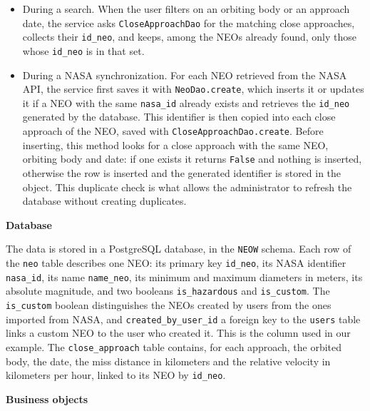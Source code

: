\documentclass[
  french,
  11pt,
  a4paper,
]{report}
\begin{document}
\begin{itemize}
\item
  During a search. When the user filters on an orbiting body or an
  approach date, the service asks \texttt{CloseApproachDao} for the
  matching close approaches, collects their \texttt{id\_neo}, and keeps,
  among the NEOs already found, only those whose \texttt{id\_neo} is in
  that set.
\item
  During a NASA synchronization. For each NEO retrieved from the NASA
  API, the service first saves it with \texttt{NeoDao.create}, which
  inserts it or updates it if a NEO with the same \texttt{nasa\_id}
  already exists and retrieves the \texttt{id\_neo} generated by the
  database. This identifier is then copied into each close approach of
  the NEO, saved with \texttt{CloseApproachDao.create}. Before
  inserting, this method looks for a close approach with the same NEO,
  orbiting body and date: if one exists it returns \texttt{False} and
  nothing is inserted, otherwise the row is inserted and the generated
  identifier is stored in the object. This duplicate check is what
  allows the administrator to refresh the database without creating
  duplicates.
\end{itemize}

\textbf{Database}

The data is stored in a PostgreSQL database, in the \texttt{NEOW}
schema. Each row of the \texttt{neo} table describes one NEO: its
primary key \texttt{id\_neo}, its NASA identifier \texttt{nasa\_id}, its
name \texttt{name\_neo}, its minimum and maximum diameters in meters,
its absolute magnitude, and two booleans \texttt{is\_hazardous} and
\texttt{is\_custom}. The \texttt{is\_custom} boolean distinguishes the
NEOs created by users from the ones imported from NASA, and
\texttt{created\_by\_user\_id} a foreign key to the \texttt{users} table
links a custom NEO to the user who created it. This is the column used
in our example. The \texttt{close\_approach} table contains, for each
approach, the orbited body, the date, the miss distance in kilometers
and the relative velocity in kilometers per hour, linked to its NEO by
\texttt{id\_neo}.

\textbf{Business objects}
\end{document}
